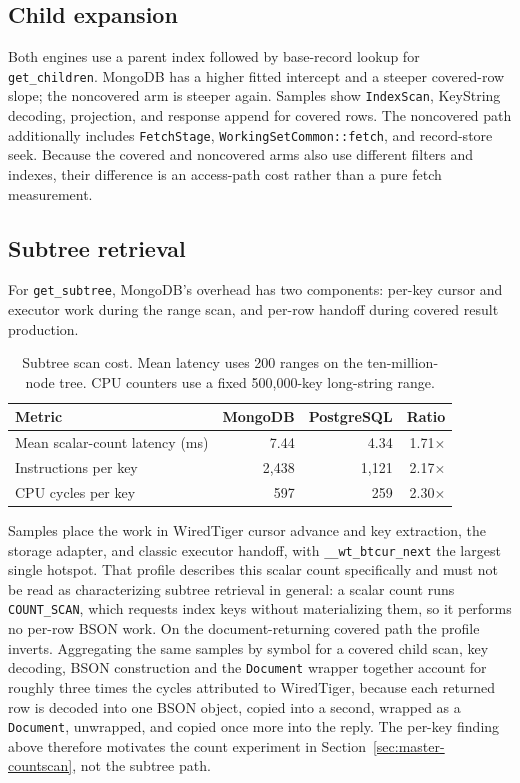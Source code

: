 \documentclass[10pt]{article}
\newcommand{\code}[1]{\texttt{#1}}
\newcommand{\hdr}{\rowcolor{hdrgray}}
\newenvironment{ctab}{\par\smallskip\centering\small
  \setlength{\tabcolsep}{5pt}\renewcommand{\arraystretch}{1.12}}{\par\smallskip}
\begin{document}
\subsection{Child expansion}

Both engines use a parent index followed by base-record lookup for
\code{get\_children}. MongoDB has a higher fitted intercept and a steeper
covered-row slope; the noncovered arm is steeper again. Samples show
\code{IndexScan}, KeyString decoding, projection, and response append for
covered rows. The noncovered path additionally includes \code{FetchStage},
\code{WorkingSetCommon::fetch}, and record-store seek. Because the covered and
noncovered arms also use different filters and indexes, their difference is an
access-path cost rather than a pure fetch measurement.

\subsection{Subtree retrieval}\label{sec:subtree-overhead}

For \code{get\_subtree}, MongoDB's overhead has two components: per-key cursor
and executor work during the range scan, and per-row handoff during covered
result production.

\begin{table}[H]
\caption{Subtree scan cost. Mean latency uses 200 ranges on the ten-million-node
tree. CPU counters use a fixed 500{,}000-key long-string range.}
\label{tab:bottleneck}
\begin{ctab}
\setlength{\tabcolsep}{9pt}
\begin{tabular}{@{}lrrr@{}}
\toprule
\hdr Metric & MongoDB & PostgreSQL & Ratio \\
\midrule
Mean scalar-count latency (ms) & 7.44 & 4.34 & 1.71$\times$ \\
Instructions per key           & 2{,}438 & 1{,}121 & 2.17$\times$ \\
CPU cycles per key             & 597 & 259 & 2.30$\times$ \\
\bottomrule
\end{tabular}
\end{ctab}
\end{table}

Samples place the work in WiredTiger cursor advance and key extraction, the
storage adapter, and classic executor handoff, with
\code{\_\_wt\_\allowbreak btcur\_\allowbreak next} the largest single hotspot.
That profile describes this scalar count specifically and must not be read as
characterizing subtree retrieval in general: a scalar count runs
\code{COUNT\_SCAN}, which requests index keys without materializing them, so it
performs no per-row BSON work. On the document-returning covered path the
profile inverts. Aggregating the same samples by symbol for a covered child
scan, key decoding, BSON construction and the \code{Document} wrapper together
account for roughly three times the cycles attributed to WiredTiger, because
each returned row is decoded into one BSON object, copied into a second, wrapped
as a \code{Document}, unwrapped, and copied once more into the reply. The
per-key finding above therefore motivates the count experiment in
Section~\ref{sec:master-countscan}, not the subtree path.
\end{document}

